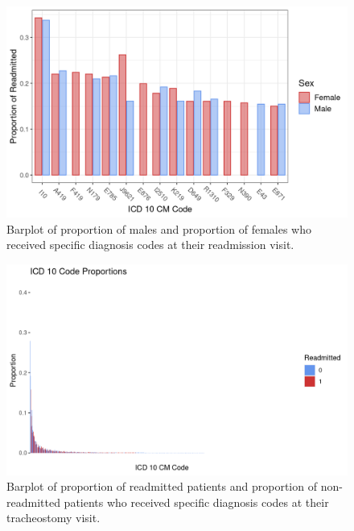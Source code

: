\documentclass[sn-basic,pdflatex]{sn-jnl}
\theoremstyle{remark}
\theoremstyle{definition}
\begin{document}
\begin{appendices}

\hypertarget{secA}{%
\section{}\label{secA}}

\begin{figure}[H]

{\centering \includegraphics[width=0.9\linewidth]{figures/readmit_diags} 

}

\caption{Barplot of proportion of males and proportion of females who received specific diagnosis codes at their readmission visit.}\label{fig:readmit_diags}
\end{figure}

\begin{figure}[H]

{\centering \includegraphics[width=1\linewidth]{figures/props} 

}

\caption{Barplot of proportion of readmitted patients and proportion of non-readmitted patients who received specific diagnosis codes at their tracheostomy visit.}\label{fig:props}
\end{figure}


\end{appendices}
\end{document}
